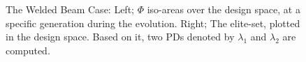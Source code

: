 
\begin{figure}[h!]
\begin{minipage}[b]{1\linewidth}
 \centering
\end{minipage}
\caption{The Welded Beam Case: Left; $\Phi$ iso-areas over the design space, at a specific generation during the evolution. Right; The elite-set, plotted in the design space. Based on it, two PDs denoted by $\lambda_1$ and $\lambda_2$ are computed.} 
\label{reco1}
\end{figure}

